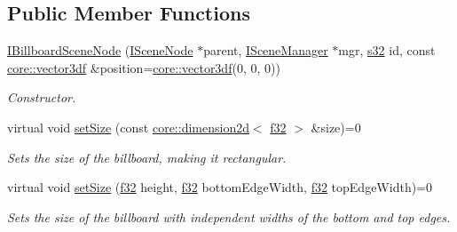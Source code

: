 \subsection*{Public Member Functions}
\begin{DoxyCompactItemize}
\item 
\mbox{\label{classirr_1_1scene_1_1IBillboardSceneNode_a32225fb98ab8f9e472272ae9e83c3c88}} 
\hyperlink{classirr_1_1scene_1_1IBillboardSceneNode_a32225fb98ab8f9e472272ae9e83c3c88}{I\+Billboard\+Scene\+Node} (\hyperlink{classirr_1_1scene_1_1ISceneNode}{I\+Scene\+Node} $\ast$parent, \hyperlink{classirr_1_1scene_1_1ISceneManager}{I\+Scene\+Manager} $\ast$mgr, \hyperlink{namespaceirr_ac66849b7a6ed16e30ebede579f9b47c6}{s32} id, const \hyperlink{namespaceirr_1_1core_a06f169d08b5c429f5575acb7edbad811}{core\+::vector3df} \&position=\hyperlink{namespaceirr_1_1core_a06f169d08b5c429f5575acb7edbad811}{core\+::vector3df}(0, 0, 0))
\begin{DoxyCompactList}\small\item\em Constructor. \end{DoxyCompactList}\item 
\mbox{\label{classirr_1_1scene_1_1IBillboardSceneNode_a911415ac24440bd3ccfcde102583fd60}} 
virtual void \hyperlink{classirr_1_1scene_1_1IBillboardSceneNode_a911415ac24440bd3ccfcde102583fd60}{set\+Size} (const \hyperlink{classirr_1_1core_1_1dimension2d}{core\+::dimension2d}$<$ \hyperlink{namespaceirr_a0277be98d67dc26ff93b1a6a1d086b07}{f32} $>$ \&size)=0
\begin{DoxyCompactList}\small\item\em Sets the size of the billboard, making it rectangular. \end{DoxyCompactList}\item 
virtual void \hyperlink{classirr_1_1scene_1_1IBillboardSceneNode_a9a5d47a00bb0160daab8fa53453a2ba4}{set\+Size} (\hyperlink{namespaceirr_a0277be98d67dc26ff93b1a6a1d086b07}{f32} height, \hyperlink{namespaceirr_a0277be98d67dc26ff93b1a6a1d086b07}{f32} bottom\+Edge\+Width, \hyperlink{namespaceirr_a0277be98d67dc26ff93b1a6a1d086b07}{f32} top\+Edge\+Width)=0
\begin{DoxyCompactList}\small\item\em Sets the size of the billboard with independent widths of the bottom and top edges. \end{DoxyCompactList}\item 

\end{DoxyCompactItemize}
